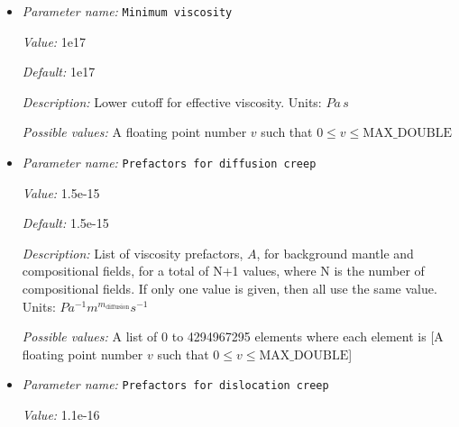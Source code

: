\begin{itemize}
{\it Description:} Stabilizes strain dependent viscosity. Units: $1 / s$


{\it Possible values:} A floating point number $v$ such that $0 \leq v \leq \text{MAX\_DOUBLE}$
\item {\it Parameter name:} {\tt Minimum viscosity}
\label{parameters:Material model/Diffusion dislocation/Minimum viscosity}
\label{parameters:Material_20model/Diffusion_20dislocation/Minimum_20viscosity}


{\it Value:} 1e17


{\it Default:} 1e17


{\it Description:} Lower cutoff for effective viscosity. Units: $Pa \, s$


{\it Possible values:} A floating point number $v$ such that $0 \leq v \leq \text{MAX\_DOUBLE}$
\item {\it Parameter name:} {\tt Prefactors for diffusion creep}
\label{parameters:Material model/Diffusion dislocation/Prefactors for diffusion creep}
\label{parameters:Material_20model/Diffusion_20dislocation/Prefactors_20for_20diffusion_20creep}


{\it Value:} 1.5e-15


{\it Default:} 1.5e-15


{\it Description:} List of viscosity prefactors, $A$, for background mantle and compositional fields, for a total of N+1 values, where N is the number of compositional fields. If only one value is given, then all use the same value. Units: $Pa^{-1} m^{m_{\text{diffusion}}} s^{-1}$


{\it Possible values:} A list of 0 to 4294967295 elements where each element is [A floating point number $v$ such that $0 \leq v \leq \text{MAX\_DOUBLE}$]
\item {\it Parameter name:} {\tt Prefactors for dislocation creep}
\label{parameters:Material model/Diffusion dislocation/Prefactors for dislocation creep}
\label{parameters:Material_20model/Diffusion_20dislocation/Prefactors_20for_20dislocation_20creep}


{\it Value:} 1.1e-16



\end{itemize}
